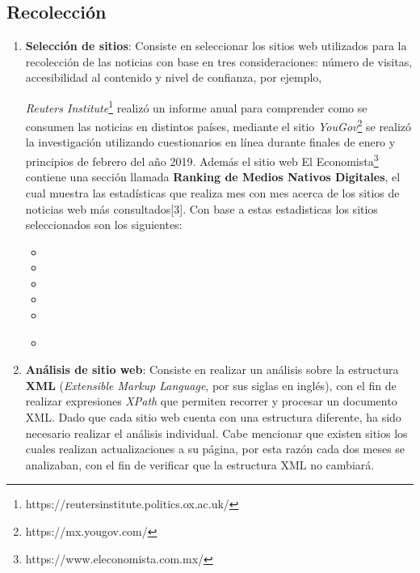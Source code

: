 \subsection{Recolección}

\begin{enumerate}
  \item \textbf{Selección de sitios}: Consiste en seleccionar los sitios web utilizados para la recolección de las noticias con base en tres consideraciones: número de visitas, accesibilidad al contenido y nivel de confianza, por ejemplo, 


  \textit{Reuters Institute}\footnote{https://reutersinstitute.politics.ox.ac.uk/} realizó un informe anual para comprender como se consumen las noticias en distintos países, mediante el sitio \textit{YouGov}\footnote{https://mx.yougov.com/} se realizó la investigación utilizando cuestionarios en línea durante finales de enero y principios de febrero del año 2019. Además el sitio web El Economista\footnote{https://www.eleconomista.com.mx/} contiene una sección llamada \textbf{Ranking de Medios Nativos Digitales}, el cual muestra las estadísticas que realiza mes con mes acerca de los sitios de noticias web más consultados[3]. Con base a estas estadisticas los sitios seleccionados son los siguientes:\\

  \begin{itemize}
    \item {}
    \item {}
    \item {}
    \item {}
    \item {}
    \item {}\\
  \end{itemize}

  \item \textbf{Análisis de sitio web}: Consiste en realizar un análisis sobre la estructura \textbf{XML} (\textit{Extensible Markup Language}, por sus siglas en inglés), con el fin de realizar expresiones \textit{XPath} que permiten recorrer y procesar un documento XML. Dado que cada sitio web cuenta con una estructura diferente, ha sido necesario realizar el análisis individual. Cabe mencionar que existen sitios los cuales realizan actualizaciones a su página, por esta razón cada dos meses se analizaban, con el fin de verificar que la estructura XML no cambiará.\\


\end{enumerate}
